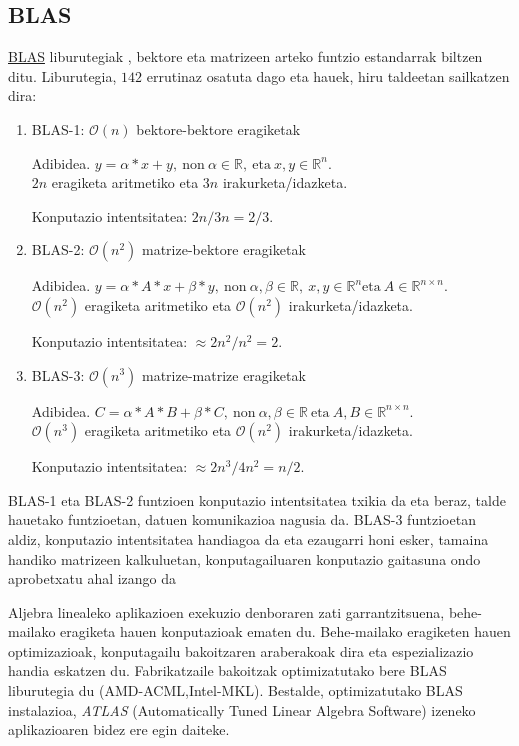 \subsection*{BLAS}

\href{http://www.netlib.org/blas}{BLAS} liburutegiak \cite{Intel2015}, bektore eta matrizeen arteko funtzio estandarrak biltzen ditu. Liburutegia, $142$ errutinaz osatuta dago eta hauek, hiru taldeetan sailkatzen dira: 
\begin{enumerate}
\item BLAS-1: $\mathcal{O}(n)$ bektore-bektore eragiketak

 Adibidea.
 $y=\alpha*x+y, \ \text{non} \ \alpha \in \mathbb{R}, \ \text{eta} \  x,y \in \mathbb{R}^n$. \\
 $2n$ eragiketa aritmetiko eta $3n$ irakurketa/idazketa.
 
 Konputazio intentsitatea: $2n/3n=2/3$. 

\item BLAS-2: $\mathcal{O}(n^2)$ matrize-bektore eragiketak

 Adibidea.
 $y=\alpha*A*x+\beta*y, \ \text{non} \ \alpha,\beta \in \mathbb{R},\ x,y \in \mathbb{R}^n \text{eta} \ A \in \mathbb{R}^{n \times n}$. \\ 
 $\mathcal{O}(n^2)$ eragiketa aritmetiko eta $\mathcal{O}(n^2)$ irakurketa/idazketa.
 
 Konputazio intentsitatea: $\approx {2n^2}/{n^2}=2$. 
 
\item BLAS-3: $\mathcal{O}(n^3)$ matrize-matrize eragiketak

 Adibidea.
 $C=\alpha*A*B+\beta*C, \ \text{non} \ \alpha,\beta \in \mathbb{R} \ \text{eta} \ A,B \in \mathbb{R}^{n \times n}$. \\ 
 $\mathcal{O}(n^3)$ eragiketa aritmetiko eta $\mathcal{O}(n^2)$ irakurketa/idazketa.
 
 Konputazio intentsitatea: $\approx {2n^3}/{4n^2}={n}/{2}$. 

\end{enumerate}

BLAS-1 eta BLAS-2 funtzioen konputazio intentsitatea txikia da eta beraz, talde hauetako funtzioetan, datuen komunikazioa nagusia da. BLAS-3 funtzioetan aldiz, konputazio intentsitatea handiagoa da eta ezaugarri honi esker, tamaina handiko matrizeen kalkuluetan, konputagailuaren konputazio gaitasuna ondo aprobetxatu ahal izango da 

Aljebra linealeko aplikazioen exekuzio denboraren zati garrantzitsuena, behe-mailako eragiketa hauen konputazioak ematen du. Behe-mailako eragiketen hauen optimizazioak, konputagailu bakoitzaren araberakoak dira eta espezializazio handia eskatzen du. Fabrikatzaile bakoitzak optimizatutako bere BLAS liburutegia du (AMD-ACML,Intel-MKL). Bestalde, optimizatutako BLAS instalazioa, \emph{ATLAS} (Automatically Tuned Linear Algebra Software) izeneko aplikazioaren bidez ere egin daiteke. 

